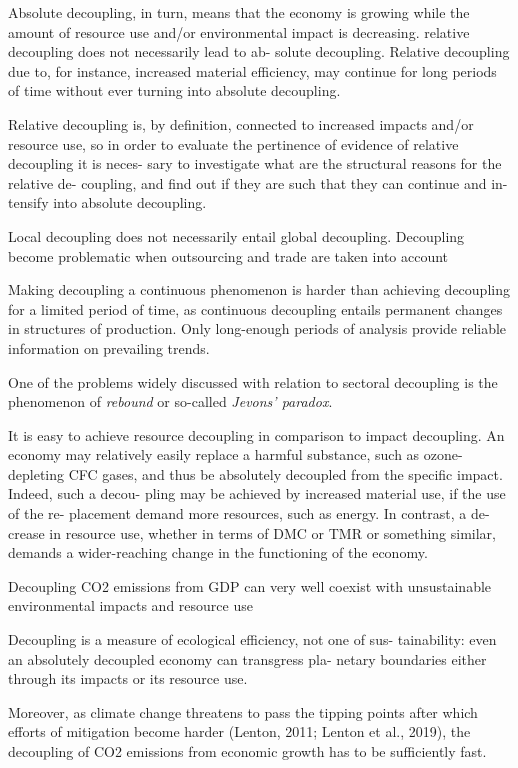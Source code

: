 \documentclass[
]{book}
\begin{document}
Absolute decoupling, in turn, means that the economy is growing while
the amount of resource use and/or environmental impact is decreasing.
relative decoupling does not necessarily lead to ab-
solute decoupling. Relative decoupling due to, for instance, increased
material efficiency, may continue for long periods of time without ever
turning into absolute decoupling.

Relative decoupling is, by definition,
connected to increased impacts and/or resource use, so in order to
evaluate the pertinence of evidence of relative decoupling it is neces-
sary to investigate what are the structural reasons for the relative de-
coupling, and find out if they are such that they can continue and in-
tensify into absolute decoupling.

Local decoupling does not necessarily entail global decoupling.
Decoupling become problematic
when outsourcing and trade are taken into account

Making decoupling a continuous phenomenon is harder than achieving decoupling for a limited period of
time, as continuous decoupling entails permanent changes in structures
of production.
Only long-enough periods of analysis provide reliable information on prevailing trends.

One of the problems widely discussed
with relation to sectoral decoupling is the phenomenon of \emph{rebound} or
so-called \emph{Jevons' paradox}.

It is easy to achieve resource decoupling in comparison
to impact decoupling. An economy may relatively easily replace a
harmful substance, such as ozone-depleting CFC gases, and thus be
absolutely decoupled from the specific impact. Indeed, such a decou-
pling may be achieved by increased material use, if the use of the re-
placement demand more resources, such as energy. In contrast, a de-
crease in resource use, whether in terms of DMC or TMR or something
similar, demands a wider-reaching change in the functioning of the
economy.

Decoupling CO2 emissions from GDP can very well coexist with unsustainable environmental
impacts and resource use

Decoupling is a measure of ecological efficiency, not one of sus-
tainability: even an absolutely decoupled economy can transgress pla-
netary boundaries either through its impacts or its resource use.

Moreover, as climate change threatens to pass the tipping points
after which efforts of mitigation become harder (Lenton, 2011; Lenton
et al., 2019), the decoupling of CO2 emissions from economic growth
has to be sufficiently fast.
\end{document}
